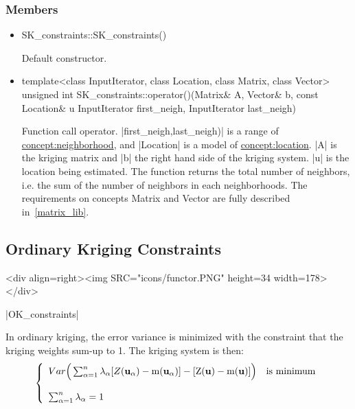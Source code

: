 \documentclass[12pt,twoside]{report}
\newcommand{\mloc}[1]{\rm{\bf #1}}
\begin{document}
 
\htmlrule[CLEAR=all]  \subsubsection*{Members}
\begin{itemize}

\item
 \begin{code} 
SK_constraints::SK_constraints()
\end{code}

Default constructor.

\item
 \begin{code} 
template<class InputIterator, class Location, class Matrix, class Vector>
unsigned int
SK_constraints::operator()(Matrix& A, Vector& b,
                           const Location& u
                           InputIterator first_neigh, InputIterator last_neigh)

\end{code}

Function call operator. |first_neigh,last_neigh)| is a range of \hyperref{Neighborhood}{Neighborhood (see Section}{)}{concept:neighborhood}, and |Location| is a model of \hyperref{Location}{Location (see Section}{)}{concept:location}. |A| is the kriging matrix and |b| the right hand side of the kriging system. |u| is the location being estimated. The function returns the total number of neighbors, i.e. the sum of the number of neighbors in each neighborhoods. The requirements on concepts Matrix and Vector are fully described in~\ref{matrix_lib}.
\end{itemize}










\subsection{Ordinary Kriging Constraints}
\begin{htmlonly}
<div align=right><img SRC="icons/functor.PNG" height=34 width=178></div>
\end{htmlonly}

|OK_constraints|
\vspace{0.3cm}

In ordinary kriging, the error variance is minimized with the constraint that the kriging weights sum-up to 1. The kriging system is then:
\begin{displaymath}
  \left\{ \begin{array}{l}
      Var \Big( \sum_{\alpha=1}^{n} \lambda_{\alpha} [Z(\mloc{u}_{\alpha})-m(\mloc{u}_{\alpha})] - [Z(\mloc{u})-m(\mloc{u})] \Big) \quad \textrm{is minimum} \\ \\
      \sum_{\alpha=1}^{n} \lambda_{\alpha} =1
    \end{array} \right.
\end{displaymath}
\end{document}
